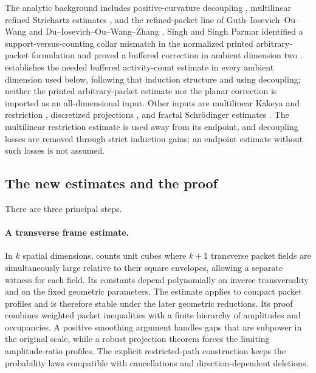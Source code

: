 The analytic background includes positive-curvature decoupling
\citep{BD2015}, multilinear refined Strichartz estimates
\citep[Theorem~4.2]{DuGuthLiZhang2018}, and the refined-packet line of
Guth--Iosevich--Ou--Wang and Du--Iosevich--Ou--Wang--Zhang
\citep{GIOW2020,DIOWZ2021}.  Singh and Singh Parmar identified a
support-versus-counting collar mismatch in the normalized printed
arbitrary-packet formulation and proved a buffered correction in
ambient dimension two
\citep[Theorems~1.1--1.2 and Appendix~A]{SinghSinghParmar2026}.
 establishes the needed buffered
activity-count estimate in every ambient dimension used below,
following that induction structure and using decoupling; neither the
printed arbitrary-packet
estimate nor the planar correction is imported as an all-dimensional
input.  Other inputs are multilinear Kakeya and restriction
\citep{BCT2006,Guth2010,Tao2020}, discretized projections
\citep{He2020}, and fractal Schr\"odinger estimates
\citep{DuZhang2019}.  The multilinear restriction estimate is used
away from its endpoint, and decoupling losses are removed through
strict induction gains; an endpoint estimate without such losses is
not assumed.

\subsection{The new estimates and the proof}

There are three principal steps.

\paragraph{A transverse frame estimate.}
In $k$ spatial dimensions,  counts unit cubes where
$k+1$ transverse packet fields are simultaneously large relative to
their square envelopes, allowing a separate witness for each field.
Its constants depend polynomially on inverse transversality and on
the fixed geometric parameters.  The estimate applies to compact
packet profiles and is therefore stable under the later geometric
reductions.  Its proof combines weighted packet inequalities with a
finite hierarchy of amplitudes and occupancies.  A positive smoothing
argument handles gaps that are subpower in the original scale, while
a robust projection theorem forces the limiting amplitude-ratio profiles.
The explicit restricted-path construction keeps the probability laws
compatible with cancellations and direction-dependent deletions.

